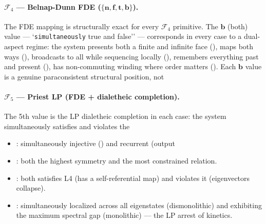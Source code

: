 \documentclass[12pt,a4paper]{article}
\begin{document}
\paragraph{$\mathcal{F}_4$ --- Belnap-Dunn FDE ($\{\mathbf{n}, \mathbf{f}, \mathbf{t},
\mathbf{b}\}$).}
The FDE mapping is structurally exact for every $\mathcal{F}_4$ primitive. The $\mathbf{b}$ (both) value ---
`\texttt{simultaneously} true and false'' --- corresponds in every case to a dual-aspect regime: the system presents both a
finite and infinite face (), maps both ways (), broadcasts to all while sequencing
locally (), remembers everything past and present (), has non-commuting winding
where order matters (). Each $\mathbf{b}$ value is a genuine paraconsistent structural position, not
\paragraph{$\mathcal{F}_5$ --- Priest LP (FDE + dialetheic completion).}
The 5th value is the LP dialetheic completion in each case: the system simultaneously satisfies and violates the

\begin{itemize}
 \item {}: simultaneously injective () and recurrent (output
 \item {}: both the highest symmetry and the most constrained relation.
 \item {}: both satisfies L4 (has a self-referential map) and violates it
 (eigenvectors collapse).
 \item {}: simultaneously localized across all eigenstates (dismonolithic) and exhibiting the
maximum spectral gap (monolithic) --- the LP arrest of kinetics.
\end{itemize}
\end{document}
